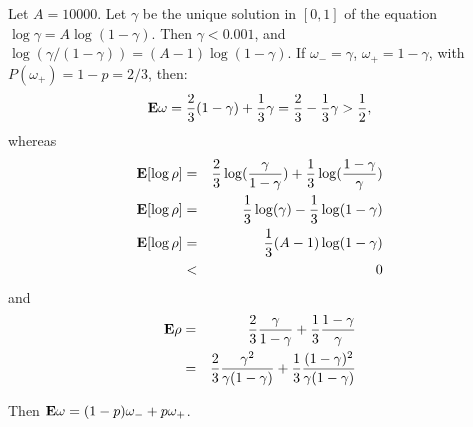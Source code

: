 \documentclass[11pt]{article} \usepackage{amssymb}
\newcommand{\E}{{\bf E}} \newcommand{\Cov}{{\bf Cov}}
\begin{document}
Let $A=10000$. 
Let $\gamma$ be the unique solution in $[0,1]$ of the equation 
$\log\gamma=A\log(1-\gamma)$. 
Then $\gamma<0.001$, and $\log(\gamma/(1-\gamma))=(A-1)\log(1-\gamma)$.
If $\omega_-=\gamma$, $\omega_+=1-\gamma$, with $P(\omega_+)=1-p=2/3$, then:
\begin{equation*}
  \E\omega={2\over 3}(1-\gamma)+{1\over 3}\gamma
          ={2\over 3}-{1\over 3}\gamma>{1\over 2},
\end{equation*}
whereas 
\begin{eqnarray*}
  \E[\log\rho]&=&{2\over 3}\log({\gamma\over 1-\gamma})+
                 {1\over 3}\log({1-\gamma\over \gamma})\\
  \E[\log\rho]&=&{1\over 3}\log(\gamma)-
                 {1\over 3}\log(1-\gamma)\\
  \E[\log\rho]&=&{1\over 3}(A-1)\log(1-\gamma)\\
              &<&0
\end{eqnarray*} 
and
\begin{eqnarray*}
  \E\rho
  &=& {2\over 3}{\gamma \over 1-\gamma}+{1\over 3}{1-\gamma \over \gamma}\\
  &=& {2\over 3}{\gamma^2 \over \gamma(1-\gamma)}
      +{1\over 3}{(1-\gamma)^2 \over \gamma(1-\gamma)}\\
\end{eqnarray*}

Then 
$\E\omega=(1-p)\omega_-+p\omega_+$. 
\end{document}
